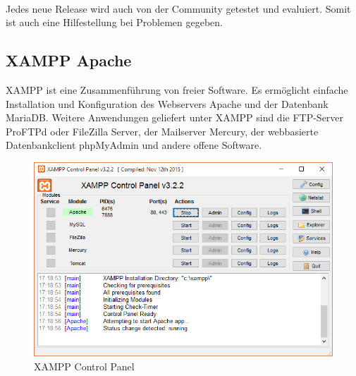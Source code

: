 	\paragraph{}
	Jedes neue Release wird auch von der Community getestet und evaluiert. Somit ist auch eine Hilfestellung bei Problemen gegeben.
	\subsection{XAMPP Apache}
	XAMPP ist eine Zusammenführung von freier Software. Es ermöglicht einfache Installation und Konfiguration des Webservers Apache und der Datenbank MariaDB. Weitere Anwendungen geliefert unter XAMPP sind die FTP-Server ProFTPd oder FileZilla Server, der Mailserver Mercury, der webbasierte Datenbankclient phpMyAdmin und andere offene Software.
	
	
	\begin{figure}[h]
		\centering
		\includegraphics[scale=.8]{figures/xampp_gui.png}
		\caption{XAMPP Control Panel}
		\label{XAMPP_GUI}
	\end{figure}

